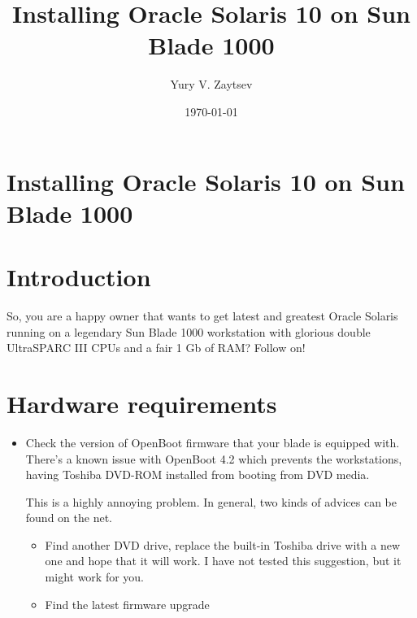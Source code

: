 \documentclass[12pt,a4paper]{article}
\title{Installing Oracle Solaris 10 on Sun Blade 1000}
\author{Yury V. Zaytsev}
\date{\today}
\begin{document}
\section*{Installing Oracle Solaris 10 on Sun Blade 1000}

\section{Introduction}

So, you are a happy owner that wants to get latest and greatest Oracle Solaris running on a legendary Sun Blade 1000 workstation with glorious double UltraSPARC III CPUs and a fair 1 Gb of RAM? Follow on!

\section{Hardware requirements}

\begin{itemize}

	\item Check the version of OpenBoot firmware that your blade is equipped with. There's a known issue with OpenBoot 4.2 which prevents the workstations, having Toshiba DVD-ROM installed from booting from DVD media.

This is a highly annoying problem. In general, two kinds of advices can be found on the net.

	\begin{itemize}

		\item Find another DVD drive, replace the built-in Toshiba drive with a new one and hope that it will work. I have not tested this suggestion, but it might work for you.

		\item Find the latest firmware upgrade 

	\end{itemize}

\end{itemize}
\end{document}
